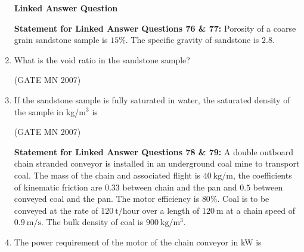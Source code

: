 \documentclass[journal]{IEEEtran}
\begin{document}
\begin{enumerate}
\begin{center}
	\textbf{Linked Answer Question}
\end{center}

\textbf{Statement for Linked Answer Questions 76 \& 77:}  
Porosity of a coarse grain sandstone sample is $15\%$. The specific gravity of sandstone is $2.8$.

\item What is the void ratio in the sandstone sample? 


	\hfill (GATE MN 2007)
    \begin{enumerate}
    \end{enumerate}


    \item If the sandstone sample is fully saturated in water, the saturated density of the sample in kg/m$^3$ is  
	  
	    \hfill (GATE MN 2007)
    \begin{enumerate}
    \end{enumerate}



\textbf{Statement for Linked Answer Questions 78 \& 79:} A double outboard chain stranded conveyor is installed in an underground coal mine to transport coal. 
The mass of the chain and associated flight is $40 \ \mathrm{kg/m}$, the coefficients of kinematic friction are $0.33$ between chain and the pan and $0.5$ between conveyed coal and the pan. 
The motor efficiency is $80\%$. 
Coal is to be conveyed at the rate of $120 \ \mathrm{t/hour}$ over a length of $120 \ \mathrm{m}$ at a chain speed of $0.9 \ \mathrm{m/s}$. 
The bulk density of coal is $900 \ \mathrm{kg/m^3}$.
\item The power requirement of the motor of the chain conveyor in kW is  


\end{enumerate}
\end{document}
